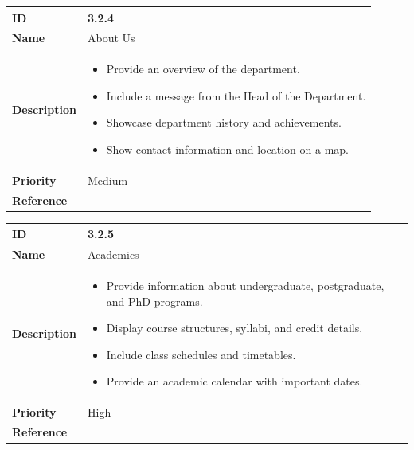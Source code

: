 \documentclass[11pt]{article}
\begin{document}
\begin{center}
\begin{tabular}{ | >{\bfseries}m{5em} | m{10cm} |  } 
  \hline
  ID & 3.2.4\\  
  \hline
  Name & About Us \\  
  \hline
  Description & 
  \begin{itemize}
      \item Provide an overview of the department.
      \item Include a message from the Head of the Department.
      \item Showcase department history and achievements.
      \item Show contact information and location on a map.
  \end{itemize} \\ 
  \hline
  Priority & Medium\\
  \hline 
  Reference & \\
  \hline
\end{tabular}
\end{center}

\vspace{0.5cm}


\begin{center}
\begin{tabular}{ | >{\bfseries}m{5em} | m{10cm} |  } 
  \hline
  ID & 3.2.5\\  
  \hline
  Name & Academics \\  
  \hline
  Description & 
  \begin{itemize}
      \item Provide information about undergraduate, postgraduate, and PhD programs.
      \item Display course structures, syllabi, and credit details.
      \item Include class schedules and timetables.
      \item Provide an academic calendar with important dates.
  \end{itemize} \\ 
  \hline
  Priority & High\\
  \hline 
  Reference & \\
  \hline
\end{tabular}
\end{center}

\vspace{0.5cm}
\end{document}
